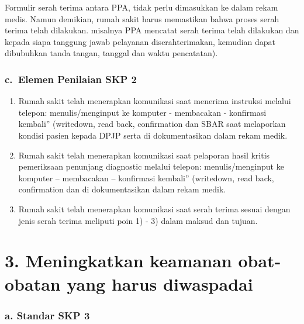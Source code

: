 \documentclass[
]{book}
\providecommand{\tightlist}{%
  \setlength{\itemsep}{0pt}\setlength{\parskip}{0pt}}
\begin{document}
Formulir serah terima antara PPA, tidak perlu dimasukkan ke dalam rekam medis. Namun demikian, rumah sakit harus memastikan bahwa proses serah terima telah dilakukan. misalnya PPA mencatat serah terima telah dilakukan dan kepada siapa tanggung jawab pelayanan diserahterimakan, kemudian dapat dibubuhkan tanda tangan, tanggal dan waktu pencatatan).

\hypertarget{c.-elemen-penilaian-skp-2}{%
\subsubsection*{c.~Elemen Penilaian SKP 2}\label{c.-elemen-penilaian-skp-2}}

\begin{enumerate}
\def\labelenumi{\arabic{enumi}.}
\tightlist
\item
  Rumah sakit telah menerapkan komunikasi saat menerima instruksi melalui telepon: menulis/menginput ke komputer - membacakan - konfirmasi kembali'' (writedown, read back, confirmation dan SBAR saat melaporkan kondisi pasien kepada DPJP serta di dokumentasikan dalam rekam medik.
\item
  Rumah sakit telah menerapkan komunikasi saat pelaporan hasil kritis pemeriksaan penunjang diagnostic melalui telepon: menulis/menginput ke komputer -- membacakan -- konfirmasi kembali'' (writedown, read back, confirmation dan di dokumentasikan dalam rekam medik.
\item
  Rumah sakit telah menerapkan komunikasi saat serah terima sesuai dengan jenis serah terima meliputi poin 1) - 3) dalam maksud dan tujuan.
\end{enumerate}

\hypertarget{meningkatkan-keamanan-obat-obatan-yang-harus-diwaspadai}{%
\section*{3. Meningkatkan keamanan obat-obatan yang harus diwaspadai}\label{meningkatkan-keamanan-obat-obatan-yang-harus-diwaspadai}}

\hypertarget{a.-standar-skp-3}{%
\subsubsection*{a. Standar SKP 3}\label{a.-standar-skp-3}}
\end{document}
